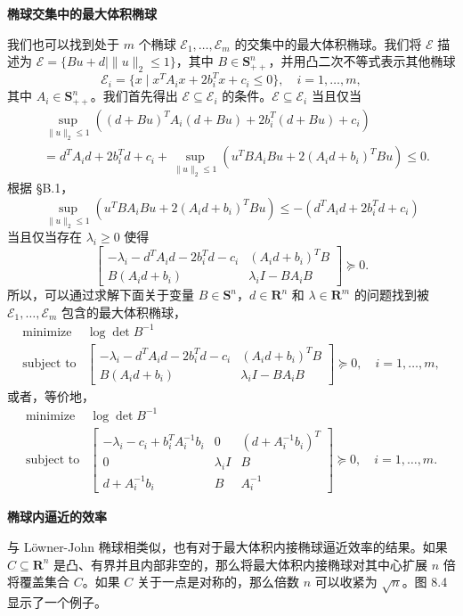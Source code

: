\documentclass[UTF8, 12pt, fontset=fandol, oneside]{ctexart}
\begin{document}
\noindent\textbf{椭球交集中的最大体积椭球}

我们也可以找到处于 $m$ 个椭球 $\mathcal{E}_1,\ldots,\mathcal{E}_m$ 的交集中的最大体积椭球。我们将 $\mathcal{E}$ 描述为 $\mathcal{E}=\{Bu+d\mid \|u\|_2\leq 1\}$，其中 $B\in\mathbf{S}_{++}^n$，并用凸二次不等式表示其他椭球
\[
\mathcal{E}_i=\{x\mid x^TA_ix+2b_i^Tx+c_i\leq 0\},\quad i=1,\ldots,m,
\]
其中 $A_i\in\mathbf{S}_{++}^n$。我们首先得出 $\mathcal{E}\subseteq \mathcal{E}_i$ 的条件。$\mathcal{E}\subseteq \mathcal{E}_i$ 当且仅当
\[
\begin{split}
&\sup_{\|u\|_2\leq 1}((d+Bu)^TA_i(d+Bu)+2b_i^T(d+Bu)+c_i)\\
&=d^TA_id+2b_i^Td+c_i
+\sup_{\|u\|_2\leq 1}(u^TBA_iBu+2(A_id+b_i)^TBu)\leq 0.
\end{split}
\]
根据 \S B.1，
\[
\sup_{\|u\|_2\leq 1}(u^TBA_iBu+2(A_id+b_i)^TBu)
\leq -(d^TA_id+2b_i^Td+c_i)
\]
当且仅当存在 $\lambda_i\geq 0$ 使得
\[
\begin{bmatrix}
-\lambda_i-d^TA_id-2b_i^Td-c_i & (A_id+b_i)^TB\\
B(A_id+b_i) & \lambda_i I-BA_iB
\end{bmatrix}\succeq 0.
\]
所以，可以通过求解下面关于变量 $B\in\mathbf{S}^n$，$d\in\mathbf{R}^n$ 和 $\lambda\in\mathbf{R}^m$ 的问题找到被 $\mathcal{E}_1,\ldots,\mathcal{E}_m$ 包含的最大体积椭球，
\[
\begin{array}{ll}
\mbox{minimize} & \log\det B^{-1}\\
\mbox{subject to} &
\begin{bmatrix}
-\lambda_i-d^TA_id-2b_i^Td-c_i & (A_id+b_i)^TB\\
B(A_id+b_i) & \lambda_i I-BA_iB
\end{bmatrix}\succeq 0,\quad i=1,\ldots,m,
\end{array}
\]
或者，等价地，
\[
\begin{array}{ll}
\mbox{minimize} & \log\det B^{-1}\\
\mbox{subject to} &
\begin{bmatrix}
-\lambda_i-c_i+b_i^TA_i^{-1}b_i & 0 & (d+A_i^{-1}b_i)^T\\
0 & \lambda_i I & B\\
d+A_i^{-1}b_i & B & A_i^{-1}
\end{bmatrix}\succeq 0,\quad i=1,\ldots,m.
\end{array}
\]

\noindent\textbf{椭球内逼近的效率}

与 Löwner-John 椭球相类似，也有对于最大体积内接椭球逼近效率的结果。如果 $C\subseteq\mathbf{R}^n$ 是凸、有界并且内部非空的，那么将最大体积内接椭球对其中心扩展 $n$ 倍将覆盖集合 $C$。如果 $C$ 关于一点是对称的，那么倍数 $n$ 可以收紧为 $\sqrt{n}$。图 8.4 显示了一个例子。
\end{document}
